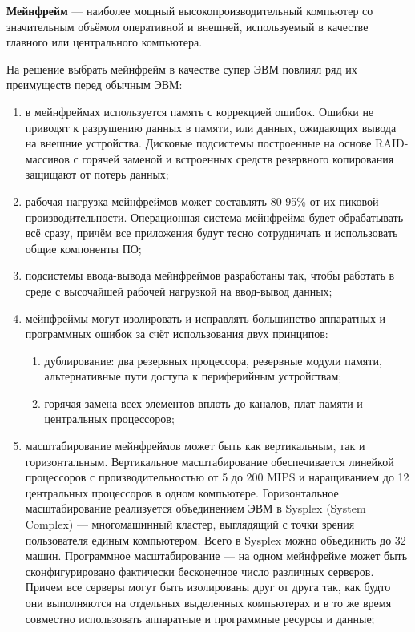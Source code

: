 \documentclass[russian,utf8,emptystyle]{eskdtext}
\begin{document}
\textbf{Мейнфрейм} — наиболее мощный высокопроизводительный компьютер со значительным объёмом оперативной и внешней, используемый в качестве главного или центрального компьютера.

На решение выбрать мейнфрейм в качестве супер ЭВМ повлиял ряд их преимуществ перед обычным ЭВМ:
\begin{enumerate}[label=-]
\item в мейнфреймах используется память с коррекцией ошибок. Ошибки не приводят к разрушению данных в памяти, или данных, ожидающих вывода на внешние устройства. Дисковые подсистемы построенные на основе RAID-массивов с горячей заменой и встроенных средств резервного копирования защищают от потерь данных;
\item рабочая нагрузка мейнфреймов может составлять 80-95\% от их пиковой производительности. Операционная система мейнфрейма будет обрабатывать всё сразу, причём все приложения будут тесно сотрудничать и использовать общие компоненты ПО;
\item подсистемы ввода-вывода мейнфреймов разработаны так, чтобы работать в среде с высочайшей рабочей нагрузкой на ввод-вывод данных;
\item мейнфреймы могут изолировать и исправлять большинство аппаратных и программных ошибок за счёт использования двух принципов:
\begin{enumerate}[label=-]
\item дублирование: два резервных процессора, резервные модули памяти, альтернативные пути доступа к периферийным устройствам;
\item горячая замена всех элементов вплоть до каналов, плат памяти и центральных процессоров;
\end{enumerate}
\item масштабирование мейнфреймов может быть как вертикальным, так и горизонтальным. Вертикальное масштабирование обеспечивается линейкой процессоров с производительностью от 5 до 200 MIPS и наращиванием до 12 центральных процессоров в одном компьютере. Горизонтальное масштабирование реализуется объединением ЭВМ в Sysplex (System Complex) — многомашинный кластер, выглядящий с точки зрения пользователя единым компьютером. Всего в Sysplex можно объединить до 32 машин. Программное масштабирование — на одном мейнфрейме может быть сконфигурировано фактически бесконечное число различных серверов. Причем все серверы могут быть изолированы друг от друга так, как будто они выполняются на отдельных выделенных компьютерах и в то же время совместно использовать аппаратные и программные ресурсы и данные;

\end{enumerate}
\end{document}
